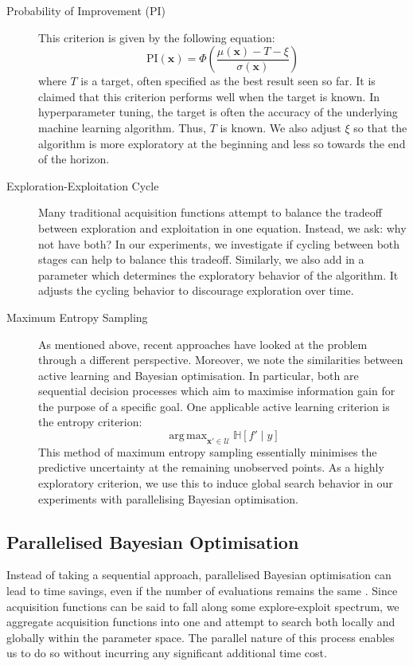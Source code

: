 \documentclass[letterpaper]{article}
\DeclareMathOperator*{\argmax}{arg\,max}
\begin{document}
\begin{description}
	\item[Probability of Improvement (PI)] This criterion is given by the following
	equation:
	$$\text{PI}(\textbf{x}) = \Phi\left( 
	\frac{\mu(\textbf{x})-T-\xi}{\sigma(\textbf{x})}\right)$$
	where $T$ is a target, often specified as the best result seen so far.
	It is claimed that this criterion performs well when the target is known.
	\cite{shahriari2016taking} In hyperparameter tuning, the target is often the 
	accuracy of the underlying machine learning algorithm.
	Thus, $T$ is known. We also adjust $\xi$ so
	that the algorithm is more exploratory at the beginning and less so towards the
	end of the horizon.
	
	\item[Exploration-Exploitation Cycle] Many traditional acquisition functions
	attempt to balance the tradeoff between exploration and exploitation in one
	equation. Instead, we ask: why not have both? In our experiments, we investigate
	if cycling between both stages can help to balance this tradeoff. Similarly, we
	also add in a parameter which determines the exploratory behavior of the algorithm.
	It adjusts the cycling behavior to discourage exploration over time.
	
	\item[Maximum Entropy Sampling] As mentioned above, recent approaches have looked
	at the problem through a different perspective. Moreover, we note the similarities
	between active learning and Bayesian optimisation. In particular, both are
	sequential decision processes which aim to maximise information gain for the
	purpose of a specific goal. One applicable active learning criterion is the
	entropy criterion:
	$$\argmax_{\textbf{x}'\in \mathcal{U}}{\mathbb{H}[f'\mid y]}$$
	This method of maximum entropy sampling essentially minimises the predictive
	uncertainty at the remaining unobserved points. As a highly exploratory criterion,
	we use this to induce global search behavior in our experiments with parallelising
	Bayesian optimisation.
\end{description}

\subsection{Parallelised Bayesian Optimisation}
Instead of taking a sequential approach, parallelised Bayesian optimisation can
lead to time savings, even if the number of evaluations remains the same
\cite{shahriari2016taking}. Since acquisition functions can be said to fall along
some explore-exploit spectrum, we aggregate acquisition functions into one and
attempt to search both locally and globally within the parameter space. The parallel
nature of this process enables us to do so without incurring any significant
additional time cost.
\end{document}
